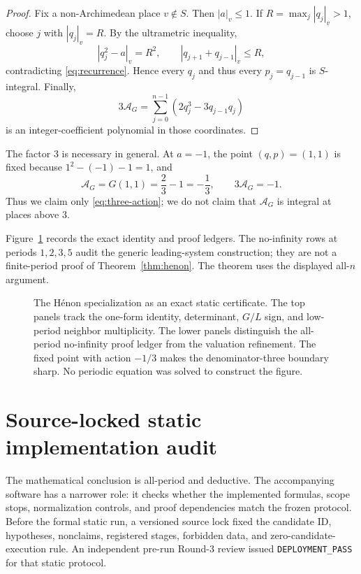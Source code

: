 \documentclass[11pt]{article}
\theoremstyle{definition}
\theoremstyle{remark}
\newcommand{\Action}{\mathcal A}
\begin{document}
\begin{proof}
Fix a non-Archimedean place $v\notin S$.  Then $|a|_v\le1$.  If
$R=\max_j|q_j|_v>1$, choose $j$ with $|q_j|_v=R$.  By the ultrametric
inequality,
\begin{equation}
 |q_j^2-a|_v=R^2,
 \qquad
 |q_{j+1}+q_{j-1}|_v\le R,
\end{equation}
contradicting \eqref{eq:recurrence}.  Hence every $q_j$ and thus every
$p_j=q_{j-1}$ is $S$-integral.  Finally,
\begin{equation}
 3\Action_G
 =\sum_{j=0}^{n-1}\left(2q_j^3-3q_{j-1}q_j\right)
\end{equation}
is an integer-coefficient polynomial in those coordinates.
\end{proof}

The factor $3$ is necessary in general.  At $a=-1$, the point $(q,p)=(1,1)$
is fixed because $1^2-(-1)-1=1$, and
\begin{equation}
  \Action_G=G(1,1)=\frac23-1=-\frac13,
  \qquad 3\Action_G=-1.
  \label{eq:sharp-third}
\end{equation}
Thus we claim only \eqref{eq:three-action}; we do not claim that
$\Action_G$ is integral at places above $3$.

Figure~\ref{fig:henon-static} records the exact identity and proof ledgers.
The no-infinity rows at periods $1,2,3,5$ audit the generic leading-system
construction; they are not a finite-period proof of
Theorem~\ref{thm:henon}.  The theorem uses the displayed all-$n$ argument.

\begin{figure}[t]
  \centering
  \HenonStaticFigure
  \caption{The H\'enon specialization as an exact static certificate.  The
  top panels track the one-form identity, determinant, $G/L$ sign, and
  low-period neighbor multiplicity.  The lower panels distinguish the
  all-period no-infinity proof ledger from the valuation refinement.  The
  fixed point with action $-1/3$ makes the denominator-three boundary sharp.
  No periodic equation was solved to construct the figure.}
  \label{fig:henon-static}
\end{figure}

\section{Source-locked static implementation audit}
\label{sec:audit}

The mathematical conclusion is all-period and deductive.  The accompanying
software has a narrower role: it checks whether the implemented formulas,
scope stops, normalization controls, and proof dependencies match the frozen
protocol.  Before the formal static run, a versioned source lock fixed the
candidate ID, hypotheses, nonclaims, registered stages, forbidden data, and
zero-candidate-execution rule.  An independent pre-run Round-3 review issued
\texttt{DEPLOYMENT\_PASS} for that static protocol.
\end{document}
